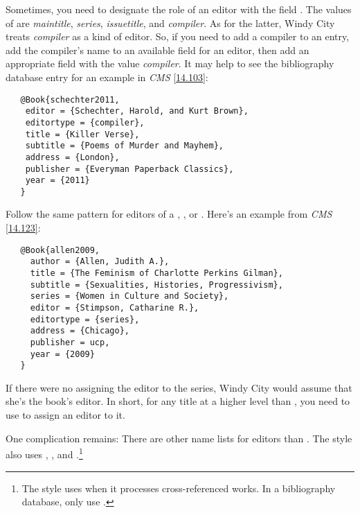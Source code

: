 \documentclass[11pt,letterpaper,oneside]{article}
\begin{document}
Sometimes, you need to designate the role of an editor with the field
. The values of  are
\textit{maintitle}, \textit{series}, \textit{issuetitle}, and
\textit{compiler}. As for the latter, Windy City treats
\textit{compiler} as a kind of editor. So, if you need to add a
compiler to an entry, add the compiler's name to an available field
for an editor, then add an appropriate  field
with the value \textit{compiler}. It may help to see the bibliography
database entry for an example in \textit{CMS} \ref{14.103}:

\begin{verbatim}
   @Book{schechter2011,
    editor = {Schechter, Harold, and Kurt Brown},
    editortype = {compiler},
    title = {Killer Verse},
    subtitle = {Poems of Murder and Mayhem},
    address = {London},
    publisher = {Everyman Paperback Classics},
    year = {2011}
   }
\end{verbatim}

\begin{citebib}
\item \cite{schechter2011}
\end{citebib}

Follow the same pattern for editors of a ,
, or . Here's an example from
\textit{CMS} \ref{14.123}:

\begin{verbatim}
   @Book{allen2009,
     author = {Allen, Judith A.},
     title = {The Feminism of Charlotte Perkins Gilman},
     subtitle = {Sexualities, Histories, Progressivism},
     series = {Women in Culture and Society},
     editor = {Stimpson, Catharine R.},
     editortype = {series},
     address = {Chicago},
     publisher = ucp,
     year = {2009}
   }
\end{verbatim}

\begin{citebib}
\item \cite{allen2009}
\end{citebib}

\noindent If there were no  assigning the editor
to the series, Windy City would assume that she's the book's editor.
In short, for any title at a higher level than , you
need to use  to assign an editor to it.

One complication remains: There are other name lists for editors than
. The style also uses ,
, and .\footnote{The style uses
 when it processes cross-referenced works. In a
bibliography database, only use .}
\end{document}
